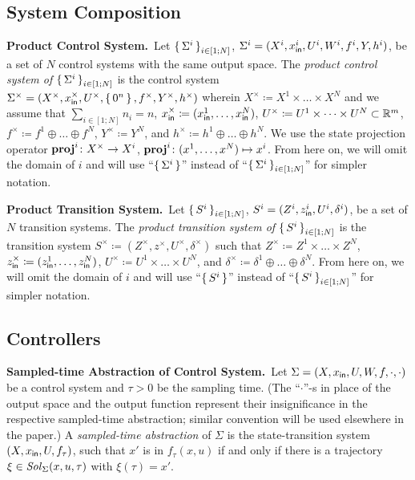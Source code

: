 \subsection{System Composition}

\smallskip
\noindent\textbf{Product Control System.}\
Let $\set{\Sigma^i}_{i\in [1;N]}$, $\Sigma^i=(X^i,x_{\mathsf{in}}^i,U^i,W^i,f^i,Y,h^i)$, be a set of $N$ control systems with the same output space.
The \emph{product control system of } $\set{\Sigma^i}_{i\in [1;N]}$ is the control system $\Sigma^\times = (X^\times, x_{\mathsf{in}}^\times, U^\times, \set{0^n}, f^\times, Y^\times, h^\times)$ wherein $X^\times\coloneqq X^1\times \ldots \times X^N$ and we assume that $\sum_{i\in [1;N]} n_i=n$, $x_{\mathsf{in}}^\times\coloneqq (x_{\mathsf{in}}^1,\ldots,x_{\mathsf{in}}^N)$, $U^\times\coloneqq U^1\times\dots\times U^N\subset \mathbb{R}^m$, $f^\times\coloneqq f^{1}\oplus \ldots\oplus f^{N}$, $Y^\times \coloneqq Y^N$, and $h^\times\coloneqq h^1\oplus \ldots \oplus h^N$. 
We use the state projection operator $\mathbf{proj}^{i}\colon X^\times\to X^i$, $\mathbf{proj}^{i}\colon (x^1,\ldots,x^N)\mapsto x^i$.
From here on, we will omit the domain of $i$ and will use ``$\set{\Sigma^i}$'' instead of ``$\set{\Sigma^i}_{i\in [1;N]}$'' for simpler notation.

\smallskip
\noindent\textbf{Product Transition System.}\
Let $\set{S^i}_{i\in [1;N]}$, $S^i=(Z^i,z_{\mathsf{in}}^i,U^i,\delta^i)$, be a set of $N$ transition systems.
The \emph{product transition system of } $\set{S^i}_{i\in [1;N]}$ is the transition system $S^\times \coloneqq (Z^\times, z^\times, U^\times, \delta^\times)$ such that $Z^\times \coloneqq Z^1\times \ldots \times Z^N$, $z^\times_{\mathsf{in}}\coloneqq (z_{\mathsf{in}}^1,\ldots,z_{\mathsf{in}}^N)$, $U^\times \coloneqq U^1\times \ldots\times U^N$, and $\delta^\times \coloneqq \delta^1\oplus\ldots \oplus \delta^N$.
From here on, we will omit the domain of $i$ and will use ``$\set{S^i}$'' instead of ``$\set{S^i}_{i\in [1;N]}$'' for simpler notation.

\subsection{Controllers}

\smallskip
\noindent\textbf{Sampled-time Abstraction of Control System.}\
Let $\Sigma = (X, x_{\mathsf{in}}, U, W, f, \cdot, \cdot)$ be a control system and $\tau>0$ be the sampling time.
(The ``$\cdot$''-s in place of the output space and the output function represent their insignificance in the respective sampled-time abstraction; similar convention will be used elsewhere in the paper.)
A \emph{sampled-time abstraction} of $\Sigma$ is the state-transition system $(X,x_{\mathsf{in}},U,f_\tau)$, such that $x'$ is in $f_\tau(x,u)$ if and only if there is a trajectory $\xi\in \mathit{Sol}_\Sigma(x,u,\tau)$ with $\xi(\tau)=x'$.

